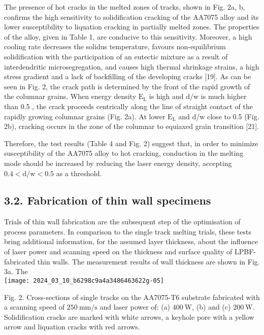 \documentclass[10pt]{article}
\begin{document}
The presence of hot cracks in the melted zones of tracks, shown in Fig. 2a, b, confirms the high sensitivity to solidification cracking of the AA7075 alloy and its lower susceptibility to liquation cracking in partially melted zones. The properties of the alloy, given in Table 1, are conducive to this sensitivity. Moreover, a high cooling rate decreases the solidus temperature, favours non-equilibrium solidification with the participation of an eutectic mixture as a result of interdendritic microsegregation, and causes high thermal shrinkage strains, a high stress gradient and a lack of backfilling of the developing cracks [19]. As can be seen in Fig. 2, the crack path is determined by the front of the rapid growth of the columnar grains. When energy density $\mathrm{E}_{\mathrm{L}}$ is high and $\mathrm{d} / \mathrm{w}$ is much higher than 0.5 , the crack proceeds centrically along the line of straight contact of the rapidly growing columnar grains (Fig. 2a). At lower $\mathrm{E}_{\mathrm{L}}$ and d/w close to 0.5 (Fig. 2b), cracking occurs in the zone of the columnar to equiaxed grain transition [21].

Therefore, the test results (Table 4 and Fig. 2) suggest that, in order to minimize susceptibility of the AA7075 alloy to hot cracking, conduction in the melting mode should be increased by reducing the laser energy density, accepting $0.4<\mathrm{d} / \mathrm{w}<0.5$ as a threshold.

\subsection*{3.2. Fabrication of thin wall specimens}
Trials of thin wall fabrication are the subsequent step of the optimisation of process parameters. In comparison to the single track melting trials, these tests bring additional information, for the assumed layer thickness, about the influence of laser power and scanning speed on the thickness and surface quality of LPBF-fabricated thin walls. The measurement results of wall thickness are shown in Fig. 3a. The\\
\texttt{[image: 2024\_03\_10\_b6298c9a4a3486463622g-05]}

Fig. 2. Cross-sections of single tracks on the AA7075-T6 substrate fabricated with a scanning speed of $250 \mathrm{~mm} / \mathrm{s}$ and laser power of: (a) $400 \mathrm{~W}$, (b) and (c) $200 \mathrm{~W}$. Solidification cracks are marked with white arrows, a keyhole pore with a yellow arrow and liquation cracks with red arrows.
\end{document}
